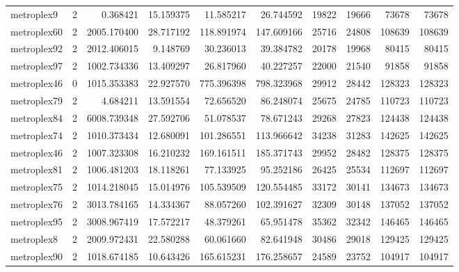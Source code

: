 \begin{longtable}{|l|r|r|r|r|r|r|r|r|r|}
metroplex9 & 2 & 0.368421 & 15.159375 & 11.585217 & 26.744592 & 19822 & 19666 & 73678 & 73678 \\
metroplex60 & 2 & 2005.170400 & 28.717192 & 118.891974 & 147.609166 & 25716 & 24808 & 108639 & 108639 \\
metroplex92 & 2 & 2012.406015 & 9.148769 & 30.236013 & 39.384782 & 20178 & 19968 & 80415 & 80415 \\
metroplex97 & 2 & 1002.734336 & 13.409297 & 26.817960 & 40.227257 & 22000 & 21540 & 91858 & 91858 \\
metroplex46 & 0 & 1015.353383 & 22.927570 & 775.396398 & 798.323968 & 29912 & 28442 & 128323 & 128323 \\
metroplex79 & 2 & 4.684211 & 13.591554 & 72.656520 & 86.248074 & 25675 & 24785 & 110723 & 110723 \\
metroplex84 & 2 & 6008.739348 & 27.592706 & 51.078537 & 78.671243 & 29268 & 27823 & 124438 & 124438 \\
metroplex74 & 2 & 1010.373434 & 12.680091 & 101.286551 & 113.966642 & 34238 & 31283 & 142625 & 142625 \\
metroplex46 & 2 & 1007.323308 & 16.210232 & 169.161511 & 185.371743 & 29952 & 28482 & 128375 & 128375 \\
metroplex81 & 2 & 1006.481203 & 18.118261 & 77.133925 & 95.252186 & 26425 & 25534 & 112697 & 112697 \\
metroplex75 & 2 & 1014.218045 & 15.014976 & 105.539509 & 120.554485 & 33172 & 30141 & 134673 & 134673 \\
metroplex76 & 2 & 3013.784165 & 14.334367 & 88.057260 & 102.391627 & 32309 & 30148 & 137052 & 137052 \\
metroplex95 & 2 & 3008.967419 & 17.572217 & 48.379261 & 65.951478 & 35362 & 32342 & 146465 & 146465 \\
metroplex8 & 2 & 2009.972431 & 22.580288 & 60.061660 & 82.641948 & 30486 & 29018 & 129425 & 129425 \\
metroplex90 & 2 & 1018.674185 & 10.643426 & 165.615231 & 176.258657 & 24589 & 23752 & 104917 & 104917 \\
\end{longtable}
